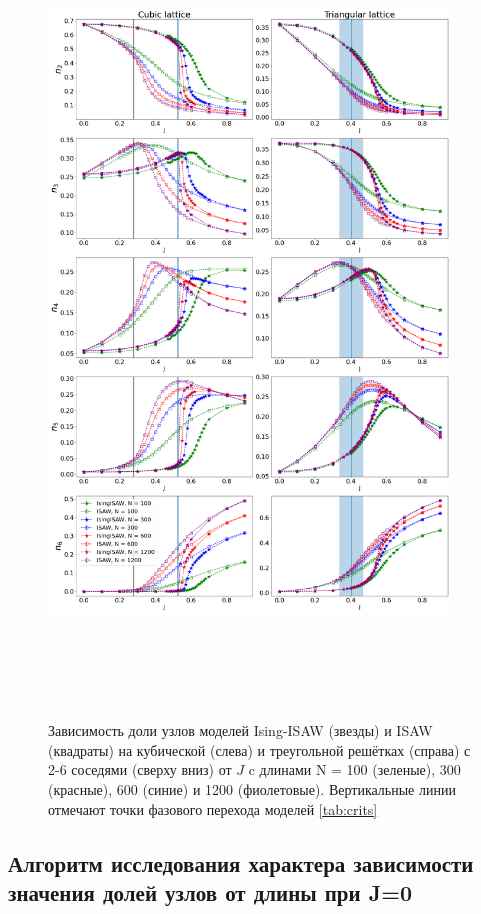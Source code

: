 \begin{figure}
    \centering
    \includegraphics[width=0.95\textwidth, height=21.5cm]{Sections/Images/Ising_vs_ISAW.png}
    \caption{Зависимость доли узлов моделей Ising-ISAW (звезды) и ISAW (квадраты) на кубической (слева) и треугольной решётках (справа) с 2-6 соседями (сверху вниз) от $J$ c длинами N = 100 (зеленые), 300 (красные), 600 (синие) и 1200 (фиолетовые). Вертикальные линии отмечают точки фазового перехода моделей \ref{tab:crits}}
    \label{fig:Ising_vs_ISAW}
\end{figure}

\newpage

\subsection{Алгоритм исследования характера зависимости значения долей узлов от длины при J=0}

